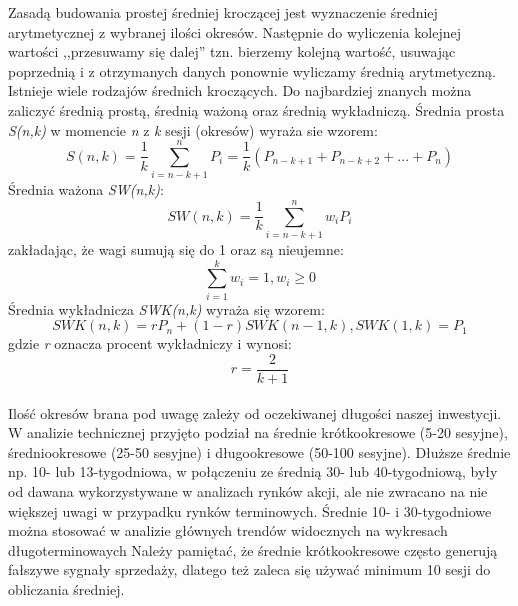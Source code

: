 \documentclass[pdflatex,11pt]{aghdpl}
\begin{document}
Zasadą budowania prostej średniej kroczącej jest wyznaczenie średniej arytmetycznej z wybranej ilości okresów. Następnie do wyliczenia kolejnej wartości ,,przesuwamy się dalej'' tzn. bierzemy kolejną wartość, usuwając poprzednią i z otrzymanych danych ponownie wyliczamy średnią arytmetyczną. Istnieje wiele rodzajów średnich kroczących. Do najbardziej znanych można zaliczyć średnią prostą, średnią ważoną oraz średnią wykładniczą. Średnia prosta \textit{S(n,k)} w momencie 
\textit{n} z \textit{k} sesji (okresów) wyraża sie wzorem:
\begin{equation}
S(n,k)=\frac{1}{k}\sum_{i=n-k+1}^{n} P_{i}=\frac{1}{k}(P_{n-k+1}+P_{n-k+2}+...+P_{n})
\label{eqn:wzor}
\end{equation}
Średnia ważona \textit{SW(n,k)}:
\begin{equation}
SW(n,k)=\frac{1}{k}\sum_{i=n-k+1}^{n}w_iP_{i}
\label{eqn:wzor}
\end{equation}
zakładając, że wagi sumują się do 1 oraz są nieujemne:
\begin{equation}
\sum_{i=1}^{k}w_i=1, w_{i} \geq 0
\label{eqn:wzor}
\end{equation}
Średnia wykładnicza \textit{SWK(n,k)} wyraża się wzorem:
\begin{equation}
SWK(n,k)=rP_n+(1-r)SWK(n-1,k), SWK(1,k)=P_1
\label{eqn:wzor}
\end{equation}
gdzie \textit{r} oznacza procent wykładniczy i wynosi:
\begin{equation}
r=\frac{2}{k+1}
\label{eqn:wzor}
\end{equation}
\paragraph{}
Ilość okresów brana pod uwagę zależy od oczekiwanej długości naszej inwestycji. W analizie technicznej przyjęto podział na średnie krótkookresowe (5-20 sesyjne), średniookresowe (25-50 sesyjne) i długookresowe (50-100 sesyjne)\cite{8}. Dłuższe średnie np. 10- lub 13-tygodniowa, w połączeniu ze średnią 30- lub 40-tygodniową, były od dawana wykorzystywane w analizach rynków akcji, ale nie zwracano na nie większej uwagi w przypadku rynków terminowych. Średnie 10- i 30-tygodniowe można stosować w analizie głównych trendów widocznych na wykresach długoterminowaych Należy pamiętać, że średnie krótkookresowe często generują fałszywe sygnały sprzedaży, dlatego też zaleca się używać minimum 10 sesji do obliczania średniej. 
\end{document}
